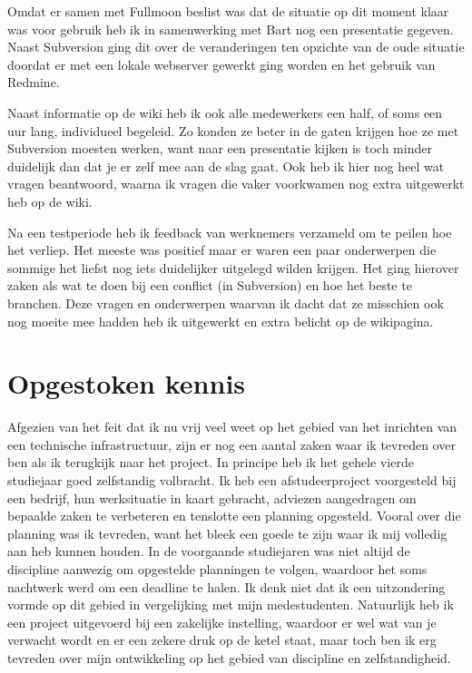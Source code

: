 Omdat er samen met Fullmoon beslist was dat de situatie op dit moment klaar was voor gebruik heb ik in samenwerking met Bart nog een presentatie gegeven. Naast Subversion ging dit over de veranderingen ten opzichte van de oude situatie doordat er met een lokale webserver gewerkt ging worden en het gebruik van Redmine.

Naast informatie op de wiki heb ik ook alle medewerkers een half, of soms een uur lang, individueel begeleid. Zo konden ze beter in de gaten krijgen hoe ze met Subversion moesten werken, want naar een presentatie kijken is toch minder duidelijk dan dat je er zelf mee aan de slag gaat. Ook heb ik hier nog heel wat vragen beantwoord, waarna ik vragen die vaker voorkwamen nog extra uitgewerkt heb op de wiki.

Na een testperiode heb ik feedback van werknemers verzameld om te peilen hoe het verliep. Het meeste was positief maar er waren een paar onderwerpen die sommige het liefst nog iets duidelijker uitgelegd wilden krijgen. Het ging hierover zaken als wat te doen bij een conflict (in Subversion) en hoe het beste te branchen. Deze vragen en onderwerpen waarvan ik dacht dat ze misschien ook nog moeite mee hadden heb ik uitgewerkt en extra belicht op de wikipagina.

\section{Opgestoken kennis}

Afgezien van het feit dat ik nu vrij veel weet op het gebied van het inrichten van een technische infrastructuur, zijn er nog een aantal zaken waar ik tevreden over ben als ik terugkijk naar het project. In principe heb ik het gehele vierde studiejaar goed zelfstandig volbracht. Ik heb een afstudeerproject voorgesteld bij een bedrijf, hun werksituatie in kaart gebracht, adviezen aangedragen om bepaalde zaken te verbeteren en tenslotte een planning opgesteld. Vooral over die planning was ik tevreden, want het bleek een goede te zijn waar ik mij volledig aan heb kunnen houden. In de voorgaande studiejaren was niet altijd de discipline aanwezig om opgestelde planningen te volgen, waardoor het soms nachtwerk werd om een deadline te halen. Ik denk niet dat ik een uitzondering vormde op dit gebied in vergelijking met mijn medestudenten. Natuurlijk heb ik een project uitgevoerd bij een zakelijke instelling, waardoor er wel wat van je verwacht wordt en er een zekere druk op de ketel staat, maar toch ben ik erg tevreden over mijn ontwikkeling op het gebied van discipline en zelfstandigheid.

